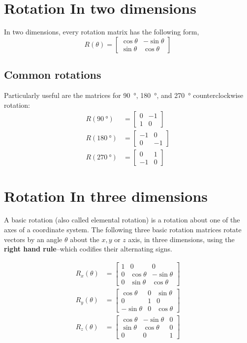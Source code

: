\section{Rotation In two dimensions}
In two dimensions, every rotation matrix has the following form,
\begin{equation}
R(\theta) = \begin{bmatrix}
\cos \theta & -\sin \theta\\
\sin \theta & \cos \theta
\end{bmatrix}
\end{equation}

\subsection{Common rotations}
Particularly useful are the matrices for \SI{90}{\degree}, \SI{180}{\degree}, and \SI{270}{\degree} counterclockwise rotation:
\begin{align*}
R(\SI{90}{\degree}) &= \begin{bmatrix}
0 & -1\\
1 & 0
\end{bmatrix}\\
R(\SI{180}{\degree}) &= \begin{bmatrix}
-1 & 0\\
0 & -1
\end{bmatrix}\\
R(\SI{270}{\degree}) &= \begin{bmatrix}
0 & 1\\
-1 & 0
\end{bmatrix}
\end{align*}

\section{Rotation In three dimensions}
A basic rotation (also called elemental rotation) is a rotation about one of the axes of a coordinate system. The following three basic rotation matrices rotate vectors by an angle $ \theta $ about the $ x, y $ or $ z $ axis, in three dimensions, using the \textbf{right hand rule}--which codifies their alternating signs.

\begin{align*}
R_x(\theta) &= \begin{bmatrix}
1 & 0 & 0 \\
0 & \cos \theta & -\sin \theta \\
0 & \sin \theta & \cos \theta
\end{bmatrix}\\
R_y(\theta) &= \begin{bmatrix}
\cos \theta & 0 & \sin \theta\\
0 & 1 & 0 \\
-\sin \theta & 0 & \cos \theta
\end{bmatrix}\\
R_z(\theta) &= \begin{bmatrix}
\cos \theta & -\sin \theta & 0 \\
\sin \theta & \cos \theta & 0 \\
0 & 0 & 1
\end{bmatrix}
\end{align*}

